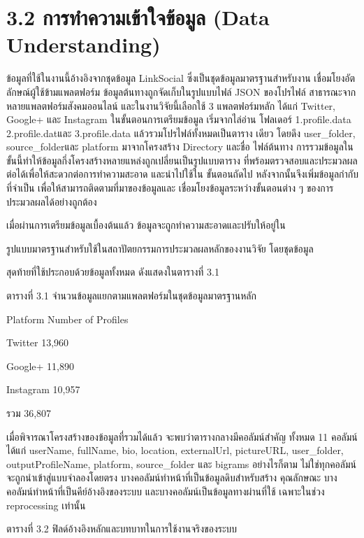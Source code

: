 \documentclass[12pt,a4paper]{report}
\begin{document}
\section*{3.2 การทำความเข้าใจข้อมูล (Data Understanding)}
ข้อมูลที่ใช้ในงานนี้อ้างอิงจากชุดข้อมูล LinkSocial ซึ่งเป็นชุดข้อมูลมาตรฐานสำหรับงาน เชื่อมโยงอัตลักษณ์ผู้ใช้ข้ามแพลตฟอร์ม ข้อมูลต้นทางถูกจัดเก็บในรูปแบบไฟล์ JSON ของโปรไฟล์ สาธารณะจากหลายแพลตฟอร์มสังคมออนไลน์ และในงานวิจัยนี้เลือกใช้ 3 แพลตฟอร์มหลัก ได้แก่ Twitter, Google+ และ Instagram ในขั้นตอนการเตรียมข้อมูล เริ่มจากไล่อ่าน โฟลเดอร์ 1.profile.data 2.profile.datและ 3.profile.data แล้วรวมโปรไฟล์ทั้งหมดเป็นตาราง เดียว โดยดึง user\_folder, source\_folderและ platform มาจากโครงสร้าง Directory และชื่อ ไฟล์ต้นทาง การรวมข้อมูลในขั้นนี้ทำให้ข้อมูลกึ่งโครงสร้างหลายแหล่งถูกเปลี่ยนเป็นรูปแบบตาราง ที่พร้อมตรวจสอบและประมวลผลต่อได้เพื่อให้สะดวกต่อการทำความสะอาด และนำไปใช้ใน ขั้นตอนถัดไป หลังจากนั้นจึงเพิ่มข้อมูลกำกับที่จำเป็น เพื่อให้สามารถติดตามที่มาของข้อมูลและ เชื่อมโยงข้อมูลระหว่างขั้นตอนต่าง ๆ ของการประมวลผลได้อย่างถูกต้อง\par
เมื่อผ่านการเตรียมข้อมูลเบื้องต้นแล้ว ข้อมูลจะถูกทำความสะอาดและปรับให้อยู่ใน\par
รูปแบบมาตรฐานสำหรับใช้ในสถาปัตยกรรมการประมวลผลหลักของงานวิจัย โดยชุดข้อมูล\par
สุดท้ายที่ใช้ประกอบด้วยข้อมูลทั้งหมด ดังแสดงในตารางที่ 3.1\par
\clearpage
\begin{center}\small ตารางที่ 3.1 จำนวนข้อมูลแยกตามแพลตฟอร์มในชุดข้อมูลมาตรฐานหลัก\end{center}
Platform Number of Profiles\par
Twitter 13,960\par
Google+ 11,890\par
Instagram 10,957\par
รวม 36,807\par
เมื่อพิจารณาโครงสร้างของข้อมูลที่รวมได้แล้ว จะพบว่าตารางกลางมีคอลัมน์สำคัญ ทั้งหมด 11 คอลัมน์ ได้แก่ userName, fullName, bio, location, externalUrl, pictureURL, user\_folder, outputProfileName, platform, source\_folder และ bigrams อย่างไรก็ตาม ไม่ใช่ทุกคอลัมน์จะถูกนำเข้าสู่แบบจำลองโดยตรง บางคอลัมน์ทำหน้าที่เป็นข้อมูลดิบสำหรับสร้าง คุณลักษณะ บางคอลัมน์ทำหน้าที่เป็นคีย์อ้างอิงของระบบ และบางคอลัมน์เป็นข้อมูลทางผ่านที่ใช้ เฉพาะในช่วง reprocessing เท่านั้น\par
\begin{center}\small ตารางที่ 3.2 ฟิลด์อ้างอิงหลักและบทบาทในการใช้งานจริงของระบบ\end{center}
\end{document}
